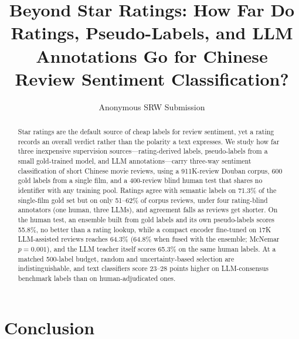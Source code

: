 \documentclass[11pt]{article}
\title{Beyond Star Ratings: How Far Do Ratings, Pseudo-Labels, and LLM\\
Annotations Go for Chinese Review Sentiment Classification?}
\author{Anonymous SRW Submission}
\begin{document}
\maketitle

\begin{abstract}
Star ratings are the default source of cheap labels for review
sentiment, yet a rating records an overall verdict rather than the
polarity a text expresses. We study how far three inexpensive
supervision sources---rating-derived labels, pseudo-labels from a
small gold-trained model, and LLM annotations---carry three-way
sentiment classification of short Chinese movie reviews, using a
911K-review Douban corpus, 600 gold labels from a single film, and a
400-review blind human test that shares no identifier with any
training pool. Ratings agree with semantic labels on 71.3\% of the
single-film gold set but on only 51--62\% of corpus reviews, under
four rating-blind annotators (one human, three LLMs), and agreement
falls as reviews get shorter. On the human test, an ensemble built
from gold labels and its own pseudo-labels scores 55.8\%, no better
than a rating lookup, while a compact encoder fine-tuned on 17K
LLM-assisted reviews reaches 64.3\% (64.8\% when fused with the
ensemble; McNemar $p{=}0.001$), and the LLM teacher itself scores
65.3\% on the same human labels. At a matched 500-label budget, random
and uncertainty-based selection are indistinguishable, and
text classifiers score 23--28 points higher on LLM-consensus benchmark
labels than on human-adjudicated ones.
\end{abstract}



\section{Conclusion}
\label{sec:conclusion}
\end{document}
